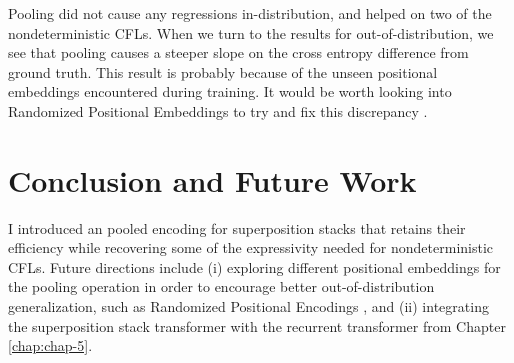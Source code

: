 Pooling did not cause any regressions in-distribution, and helped on two of the nondeterministic CFLs. When we turn to the results for out-of-distribution, we see that pooling causes a steeper slope on the cross entropy difference from ground truth. This result is probably because of the unseen positional embeddings encountered during training. It would be worth looking into Randomized Positional Embeddings to try and fix this discrepancy \citep{ruoss_randomized_2023}.

\section{Conclusion and Future Work}
I introduced an pooled encoding for superposition stacks that retains their efficiency while recovering some of the expressivity needed for nondeterministic CFLs.  Future directions include (i) exploring different positional embeddings for the pooling operation in order to encourage better out-of-distribution generalization, such as Randomized Positional Encodings \citep{ruoss_randomized_2023}, and (ii) integrating the superposition stack transformer with the recurrent transformer from Chapter \ref{chap:chap-5}.